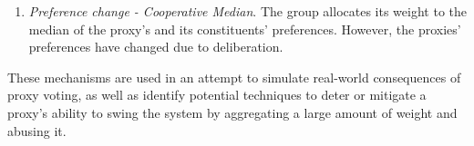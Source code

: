 \begin{enumerate}
{    }
    \item {
        \textit{Preference change - Cooperative Median}.
        The group allocates its weight to the median of the proxy's and its
        constituents' preferences.
        However, the proxies' preferences have changed due to deliberation.
    }
\end{enumerate}
These mechanisms are used in an attempt to simulate real-world consequences of proxy
voting, as well as identify potential techniques to deter or mitigate a proxy's
ability to swing the system by aggregating a large amount of weight and abusing it.
